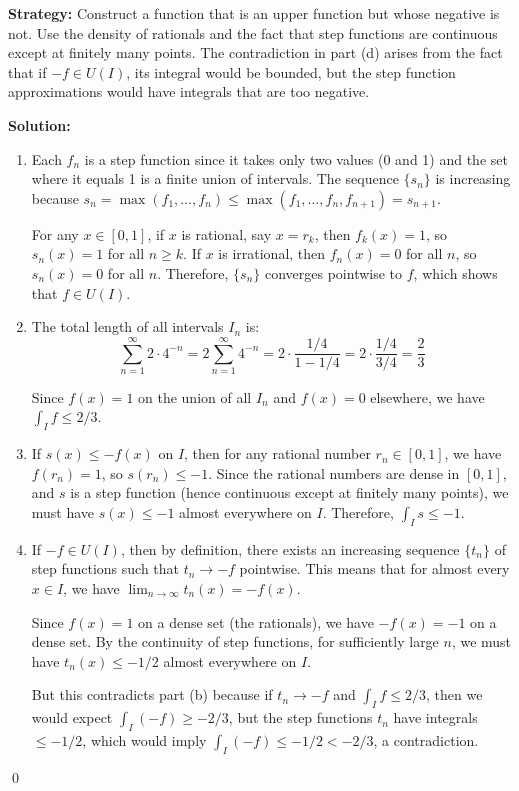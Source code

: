 \noindent\textbf{Strategy:} Construct a function that is an upper function but whose negative is not. Use the density of rationals and the fact that step functions are continuous except at finitely many points. The contradiction in part (d) arises from the fact that if $-f \in U(I)$, its integral would be bounded, but the step function approximations would have integrals that are too negative.

\bigskip\noindent\textbf{Solution:}
\begin{enumerate}[label=(\alph*)]
\item Each $f_n$ is a step function since it takes only two values (0 and 1) and the set where it equals 1 is a finite union of intervals. The sequence $\{s_n\}$ is increasing because $s_n = \max(f_1, \ldots, f_n) \leq \max(f_1, \ldots, f_n, f_{n+1}) = s_{n+1}$.

For any $x \in [0, 1]$, if $x$ is rational, say $x = r_k$, then $f_k(x) = 1$, so $s_n(x) = 1$ for all $n \geq k$. If $x$ is irrational, then $f_n(x) = 0$ for all $n$, so $s_n(x) = 0$ for all $n$. Therefore, $\{s_n\}$ converges pointwise to $f$, which shows that $f \in U(I)$.

\item The total length of all intervals $I_n$ is:
\[\sum_{n=1}^{\infty} 2 \cdot 4^{-n} = 2 \sum_{n=1}^{\infty} 4^{-n} = 2 \cdot \frac{1/4}{1 - 1/4} = 2 \cdot \frac{1/4}{3/4} = \frac{2}{3}\]

Since $f(x) = 1$ on the union of all $I_n$ and $f(x) = 0$ elsewhere, we have $\int_I f \leq 2/3$.

\item If $s(x) \leq -f(x)$ on $I$, then for any rational number $r_n \in [0, 1]$, we have $f(r_n) = 1$, so $s(r_n) \leq -1$. Since the rational numbers are dense in $[0, 1]$, and $s$ is a step function (hence continuous except at finitely many points), we must have $s(x) \leq -1$ almost everywhere on $I$. Therefore, $\int_I s \leq -1$.

\item If $-f \in U(I)$, then by definition, there exists an increasing sequence $\{t_n\}$ of step functions such that $t_n \to -f$ pointwise. This means that for almost every $x \in I$, we have $\lim_{n \to \infty} t_n(x) = -f(x)$.

Since $f(x) = 1$ on a dense set (the rationals), we have $-f(x) = -1$ on a dense set. By the continuity of step functions, for sufficiently large $n$, we must have $t_n(x) \leq -1/2$ almost everywhere on $I$.

But this contradicts part (b) because if $t_n \to -f$ and $\int_I f \leq 2/3$, then we would expect $\int_I (-f) \geq -2/3$, but the step functions $t_n$ have integrals $\leq -1/2$, which would imply $\int_I (-f) \leq -1/2 < -2/3$, a contradiction.
\end{enumerate}\qed


